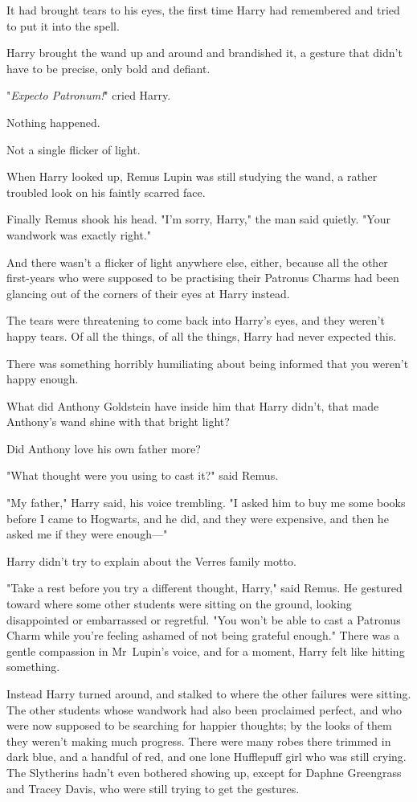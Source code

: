 It had brought tears to his eyes, the first time Harry had remembered and tried
to put it into the spell.

Harry brought the wand up and around and brandished it, a gesture that didn't
have to be precise, only bold and defiant.

"\emph{Expecto Patronum!}" cried Harry.

Nothing happened.

Not a single flicker of light.

When Harry looked up, Remus Lupin was still studying the wand, a rather
troubled look on his faintly scarred face.

Finally Remus shook his head. "I'm sorry, Harry," the man said quietly. "Your
wandwork was exactly right."

And there wasn't a flicker of light anywhere else, either, because all the
other first-years who were supposed to be practising their Patronus Charms had
been glancing out of the corners of their eyes at Harry instead.

The tears were threatening to come back into Harry's eyes, and they weren't
happy tears. Of all the things, of all the things, Harry had never expected
this.

There was something horribly humiliating about being informed that you weren't
happy enough.

What did Anthony Goldstein have inside him that Harry didn't, that made
Anthony's wand shine with that bright light?

Did Anthony love his own father more?

"What thought were you using to cast it?" said Remus.

"My father," Harry said, his voice trembling. "I asked him to buy me some books
before I came to Hogwarts, and he did, and they were expensive, and then he
asked me if they were enough—"

Harry didn't try to explain about the Verres family motto.

"Take a rest before you try a different thought, Harry," said Remus. He
gestured toward where some other students were sitting on the ground, looking
disappointed or embarrassed or regretful. "You won't be able to cast a Patronus
Charm while you're feeling ashamed of not being grateful enough." There was a
gentle compassion in Mr~Lupin's voice, and for a moment, Harry felt like
hitting something.

Instead Harry turned around, and stalked to where the other failures were
sitting. The other students whose wandwork had also been proclaimed perfect,
and who were now supposed to be searching for happier thoughts; by the looks of
them they weren't making much progress. There were many robes there trimmed in
dark blue, and a handful of red, and one lone Hufflepuff girl who was still
crying. The Slytherins hadn't even bothered showing up, except for Daphne
Greengrass and Tracey Davis, who were still trying to get the gestures.

